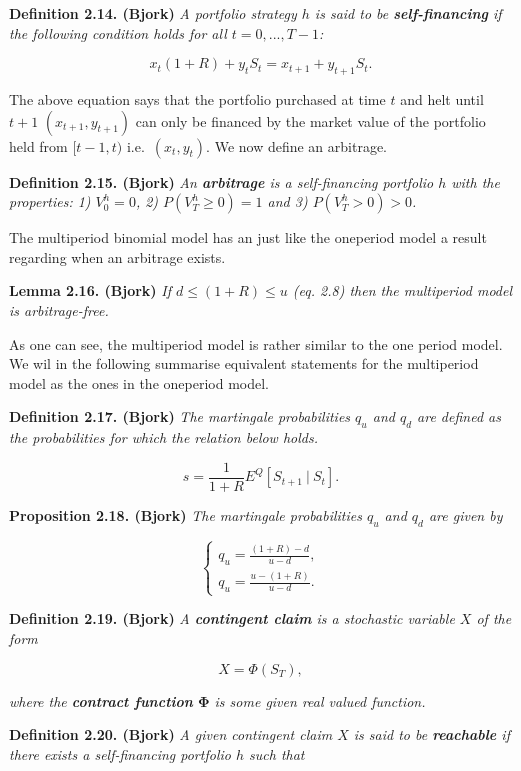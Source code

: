 \documentclass[
]{book}
\begin{document}
\textbf{Definition 2.14. (Bjork)} \emph{A portfolio strategy \(h\) is said to be \textbf{self-financing} if the following condition holds for all \(t=0,...,T-1\):}

\[
x_t(1+R)+y_tS_t=x_{t+1}+y_{t+1}S_t.
\]

The above equation says that the portfolio purchased at time \(t\) and helt until \(t+1\) \((x_{t+1},y_{t+1})\) can only be financed by the market value of the portfolio held from \([t-1,t)\) i.e.~\((x_{t},y_{t})\). We now define an arbitrage.

\textbf{Definition 2.15. (Bjork)} \emph{An \textbf{arbitrage} is a self-financing portfolio \(h\) with the properties: 1) \(V^h_0=0\), 2) \(P(V^h_T\ge 0)=1\) and 3) \(P(V^h_T>0)>0\).}

The multiperiod binomial model has an just like the oneperiod model a result regarding when an arbitrage exists.

\textbf{Lemma 2.16. (Bjork)} \emph{If \(d\le (1+R)\le u\) (eq. 2.8) then the multiperiod model is arbitrage-free.}

As one can see, the multiperiod model is rather similar to the one period model. We wil in the following summarise equivalent statements for the multiperiod model as the ones in the oneperiod model.

\textbf{Definition 2.17. (Bjork)} \emph{The martingale probabilities \(q_u\) and \(q_d\) are defined as the probabilities for which the relation below holds.}

\[
s=\frac{1}{1+R}E^Q[S_{t+1}\ \vert\ S_t].
\]

\textbf{Proposition 2.18. (Bjork)} \emph{The martingale probabilities \(q_u\) and \(q_d\) are given by}

\[
\left\{\begin{matrix}q_u=\frac{(1+R)-d}{u-d},\\ q_u=\frac{u-(1+R)}{u-d}.\end{matrix}\right.
\]

\textbf{Definition 2.19. (Bjork)} \emph{A \textbf{contingent claim} is a stochastic variable \(X\) of the form}

\[
X=\Phi(S_T),
\]

\emph{where the \textbf{contract function} \(\mathbf{\Phi}\) is some given real valued function.}

\textbf{Definition 2.20. (Bjork)} \emph{A given contingent claim \(X\) is said to be \textbf{reachable} if there exists a self-financing portfolio \(h\) such that}
\end{document}
